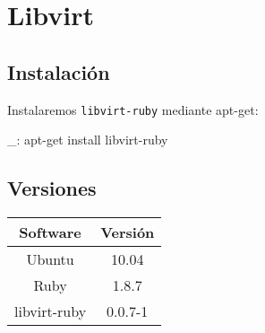 \chapter{Libvirt}
\label{comun:libvirt}

\section{Instalación}

Instalaremos \texttt{libvirt-ruby} mediante apt-get:

\begin{bashcode}
_: apt-get install libvirt-ruby
\end{bashcode}


\section{Versiones}

\begin{tabular}{|c|c|}
   \hline
   Software & Versión \\ \hline
   Ubuntu & 10.04 \\ \hline
   Ruby & 1.8.7 \\ \hline
   libvirt-ruby & 0.0.7-1 \\ \hline
\end{tabular}
